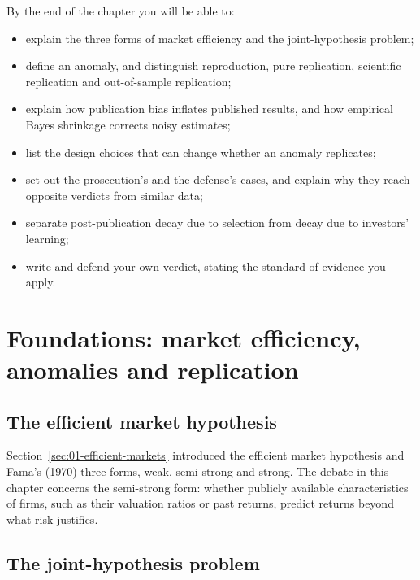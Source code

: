 By the end of the chapter you will be able to:

\begin{itemize}
  \item explain the three forms of market efficiency and the joint-hypothesis problem;
  \item define an anomaly, and distinguish reproduction, pure replication, scientific replication and out-of-sample replication;
  \item explain how publication bias inflates published results, and how empirical Bayes shrinkage corrects noisy estimates;
  \item list the design choices that can change whether an anomaly replicates;
  \item set out the prosecution's and the defense's cases, and explain why they reach opposite verdicts from similar data;
  \item separate post-publication decay due to selection from decay due to investors' learning;
  \item write and defend your own verdict, stating the standard of evidence you apply.
\end{itemize}

\section{Foundations: market efficiency, anomalies and replication}
\label{sec:07-foundations}

\subsection{The efficient market hypothesis}

Section~\ref{sec:01-efficient-markets} introduced the efficient market hypothesis and Fama's (1970) three forms, weak, semi-strong and strong. The debate in this chapter concerns the semi-strong form: whether publicly available characteristics of firms, such as their valuation ratios or past returns, predict returns beyond what risk justifies.

\subsection{The joint-hypothesis problem}

